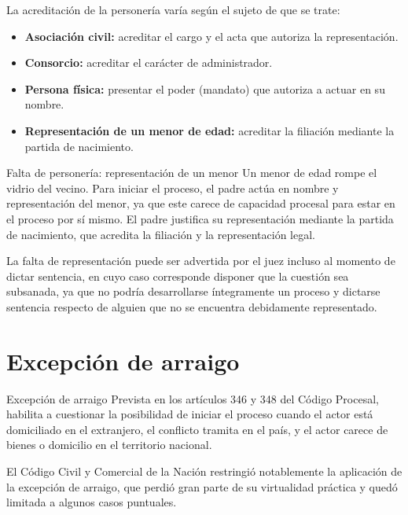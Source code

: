 \documentclass[12pt,oneside]{book}
\begin{document}
La acreditación de la personería varía según el sujeto de que se trate:

\begin{itemize}
    \item \textbf{Asociación civil:} acreditar el cargo y el acta que autoriza la representación.
    \item \textbf{Consorcio:} acreditar el carácter de administrador.
    \item \textbf{Persona física:} presentar el poder (mandato) que autoriza a actuar en su nombre.
    \item \textbf{Representación de un menor de edad:} acreditar la filiación mediante la partida de nacimiento.
\end{itemize}

\begin{example}{Falta de personería: representación de un menor}
Un menor de edad rompe el vidrio del vecino. Para iniciar el proceso, el padre actúa en nombre y representación del menor, ya que este carece de capacidad procesal para estar en el proceso por sí mismo. El padre justifica su representación mediante la partida de nacimiento, que acredita la filiación y la representación legal.
\end{example}

La falta de representación puede ser advertida por el juez incluso al momento de dictar sentencia, en cuyo caso corresponde disponer que la cuestión sea subsanada, ya que no podría desarrollarse íntegramente un proceso y dictarse sentencia respecto de alguien que no se encuentra debidamente representado.

\section{Excepción de arraigo}

\begin{definition}{Excepción de arraigo}
Prevista en los artículos 346 y 348 del Código Procesal, habilita a cuestionar la posibilidad de iniciar el proceso cuando el actor está domiciliado en el extranjero, el conflicto tramita en el país, y el actor carece de bienes o domicilio en el territorio nacional.
\end{definition}

\begin{note}
El Código Civil y Comercial de la Nación restringió notablemente la aplicación de la excepción de arraigo, que perdió gran parte de su virtualidad práctica y quedó limitada a algunos casos puntuales.
\end{note}
\end{document}
